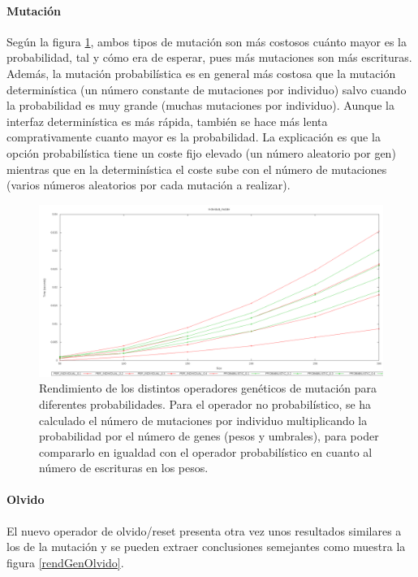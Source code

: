 \documentclass[11pt]{article}
\begin{document}
\begin{titlepage}
\paragraph{Mutación}
\label{sec-6-1-2-3}


Según la figura \ref{rendGenMutation}, ambos tipos de mutación son más costosos cuánto mayor es la probabilidad, tal y cómo era de esperar, pues más mutaciones son más escrituras. Además, la mutación probabilística es en general más costosa que la mutación determinística (un número constante de mutaciones por individuo) salvo cuando la probabilidad es muy grande (muchas mutaciones por individuo). Aunque la interfaz determinística es más rápida, también se hace más lenta comprativamente cuanto mayor es la probabilidad. La explicación es que la opción probabilística tiene un coste fijo elevado (un número aleatorio por gen) mientras que en la determinística el coste sube con el número de mutaciones (varios números aleatorios por cada mutación a realizar).

\begin{figure}[htb]
\centering
\includegraphics[width=\textwidth]{./img/Individual_mutate.png}
\caption{\label{rendGenMutation}Rendimiento de los distintos operadores genéticos de mutación para diferentes probabilidades. Para el operador no probabilístico, se ha calculado el número de mutaciones por individuo multiplicando la probabilidad por el número de genes (pesos y umbrales), para poder compararlo en igualdad con el operador probabilístico en cuanto al número de escrituras en los pesos.}
\end{figure}
\newpage
\paragraph{Olvido}
\label{sec-6-1-2-4}


El nuevo operador de olvido/reset presenta otra vez unos resultados similares a los de la mutación y se pueden extraer conclusiones semejantes como muestra la figura \ref{rendGenOlvido}.


\end{titlepage}
\end{document}
